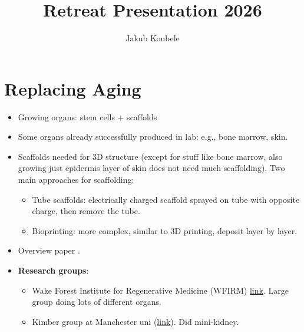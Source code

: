 \documentclass[11pt]{article}
\title{Retreat Presentation 2026}
\author{Jakub Koubele}
\date{}
\begin{document}
	
	
	\maketitle	
	
	\section*{Replacing Aging}	
	\begin{itemize}
		\item Growing organs: stem cells + scaffolds
		\item Some organs already successfully produced in lab: e.g., bone marrow, skin.
		\item Scaffolds needed for 3D structure (except for stuff like bone marrow, also growing just epidermis layer of skin does not need much scaffolding). Two main approaches for scaffolding:
		\begin{itemize}
			\item Tube scaffolds: electrically charged scaffold sprayed on tube with opposite charge, then remove the tube.
			\item Bioprinting: more complex, similar to 3D printing, deposit layer by layer.
		\end{itemize}
		\item Overview paper \citep{pinaScaffoldingStrategiesTissue2019}. 
	\item \textbf{Research groups}:
	\begin{itemize}
		\item Wake Forest Institute for Regenerative Medicine (WFIRM) \href{https://school.wakehealth.edu/research/institutes-and-centers/wake-forest-institute-for-regenerative-medicine}{link}. Large group doing lots of different organs.
		\item Kimber group at Manchester uni (\href{https://research.manchester.ac.uk/en/persons/sue.kimber/}{link}). Did mini-kidney.
	\end{itemize}	
	
	\end{itemize}
\end{document}
